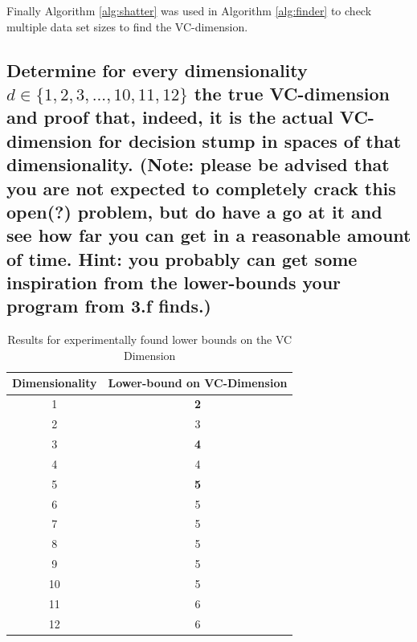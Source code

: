 \documentclass[11pt,a4paper]{article}
\begin{document}
Finally Algorithm \ref{alg:shatter} was used in Algorithm \ref{alg:finder} to check multiple data set sizes to find the VC-dimension.

\subsection{Determine for every dimensionality $d ∈ \{1, 2, 3, . . . , 10, 11, 12\}$ the true VC-dimension and proof that, indeed, it is the actual VC-dimension for decision stump in spaces of that dimensionality. (Note: please be advised that you are not expected to completely crack this open(?) problem, but do have a go at it and see how far you can get in a reasonable amount of time. Hint: you probably can get some inspiration from the lower-bounds your program from 3.f finds.)}
\label{sec:2g}

\begin{table}
    \begin{tabular}{|c|c|}
    \hline
    Dimensionality & Lower-bound on VC-Dimension \\ \hline
    1              & \textbf{2}                            \\ \hline
    2              & 3                            \\ \hline
    3              & \textbf{4}                            \\ \hline
    4              & 4                            \\ \hline
    5              & \textbf{5}                            \\ \hline
    6              &    5                         \\ \hline
    7              & 5                           \\ \hline
    8              & 5                            \\ \hline
    9              & 5                            \\ \hline
    10              & 5                            \\ \hline
    11             &  6                          \\ \hline
    12              &  6                           \\ \hline
    \end{tabular}
    \caption{Results for experimentally found lower bounds on the VC Dimension}
    \label{tab:experiment-lower-bound-vc}
\end{table}
\end{document}
